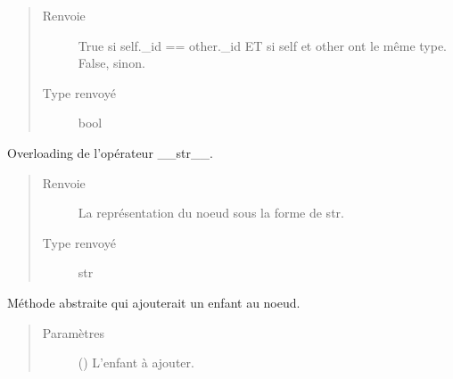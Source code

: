 \documentclass[letterpaper,10pt,french]{sphinxmanual}
\begin{document}
\begin{fulllineitems}
\begin{fulllineitems}
\begin{quote}
\begin{description}
\item[{Renvoie}] \leavevmode
{} \textendash{} True si self.\_id == other.\_id ET si self et other ont le même type.
False, sinon.

\item[{Type renvoyé}] \leavevmode
bool

\end{description}\end{quote}

\end{fulllineitems}


\begin{fulllineitems}
\label{\detokenize{index:StrategyTree.NodeST.__str__}}
Overloading de l’opérateur \_\_str\_\_.
\begin{quote}\begin{description}
\item[{Renvoie}] \leavevmode
{} \textendash{} La représentation du noeud sous la forme de str.

\item[{Type renvoyé}] \leavevmode
str

\end{description}\end{quote}

\end{fulllineitems}


\begin{fulllineitems}
\label{\detokenize{index:StrategyTree.NodeST.add_child}}
Méthode abstraite qui ajouterait un enfant au noeud.
\begin{quote}\begin{description}
\item[{Paramètres}] \leavevmode
{} ({\hyperref[\detokenize{index:StrategyTree.NodeST}]{}}) \textendash{} L’enfant à ajouter.

\end{description}\end{quote}


\end{fulllineitems}
\end{fulllineitems}
\end{document}
